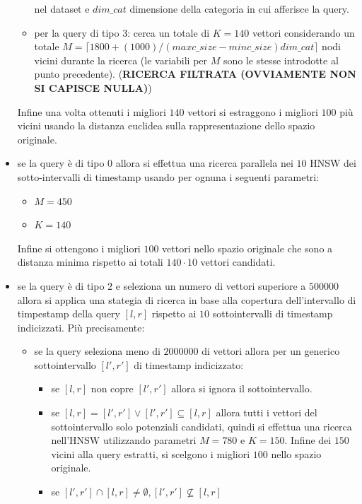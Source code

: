 \begin{itemize}
\begin{itemize}
        nel dataset e $dim\_cat$ dimensione della categoria in cui afferisce la query.
        \item per la query di tipo $3$: cerca un totale di $K=140$ vettori considerando 
        un totale $M= \lceil1800+(1000)/(maxc\_size - minc\_size)dim\_cat\rceil$ 
        nodi vicini durante la ricerca (le variabili per $M$ sono le stesse introdotte 
        al punto precedente).  (\textbf{RICERCA FILTRATA (OVVIAMENTE NON SI CAPISCE NULLA)})
    \end{itemize} 
    Infine una volta ottenuti i migliori $140$ vettori si estraggono i migliori $100$
    più vicini usando la distanza euclidea sulla rappresentazione dello spazio 
    originale.
    \item se la query è di tipo $0$ allora si effettua una ricerca parallela nei 
    $10$ HNSW dei sotto-intervalli di timestamp usando per ognuna i seguenti parametri:
    \begin{itemize}
        \item $M=450$
        \item $K=140$
    \end{itemize} 
    Infine si ottengono i migliori $100$ vettori nello spazio originale che sono 
    a distanza minima rispetto ai totali $140\cdot 10$ vettori candidati.
    \item se la query è di tipo $2$ e seleziona un numero di vettori 
    superiore a $500000$ allora si applica una stategia di ricerca in base alla 
    copertura dell'intervallo di timpestamp della query $[l,r]$ rispetto ai $10$ sottointervalli
    di timestamp indicizzati. Più precisamente:
    \begin{itemize}
        \item se la query seleziona meno di $2000000$ di vettori allora per un 
        generico sottointervallo $[l',r']$ di timestamp indicizzato:
        \begin{itemize}
            \item se $[l,r]$ non copre $[l',r']$ allora si ignora il sottointervallo.
            \item se $[l,r] = [l',r'] \lor  [l',r'] \subseteq [l,r]$ allora 
            tutti i vettori del sottointervallo solo potenziali candidati, 
            quindi si effettua una ricerca nell'HNSW
            utilizzando parametri $M=780$ e $K=150$.
            Infine dei $150$ vicini alla query estratti, si scelgono i migliori $100$ 
            nello spazio originale.
            \item se $[l',r'] \cap [l,r] \ne \emptyset, [l',r'] \not \subseteq [l,r]$ 

\end{itemize}
\end{itemize}
\end{itemize}
